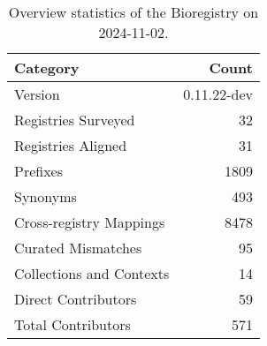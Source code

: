 \begin{table}
\caption{Overview statistics of the Bioregistry on 2024-11-02.}
\label{tab:bioregistry-summary}
\begin{tabular}{lr}
\toprule
Category & Count \\
\midrule
Version & 0.11.22-dev \\
Registries Surveyed & 32 \\
Registries Aligned & 31 \\
Prefixes & 1809 \\
Synonyms & 493 \\
Cross-registry Mappings & 8478 \\
Curated Mismatches & 95 \\
Collections and Contexts & 14 \\
Direct Contributors & 59 \\
Total Contributors & 571 \\
\bottomrule
\end{tabular}
\end{table}
